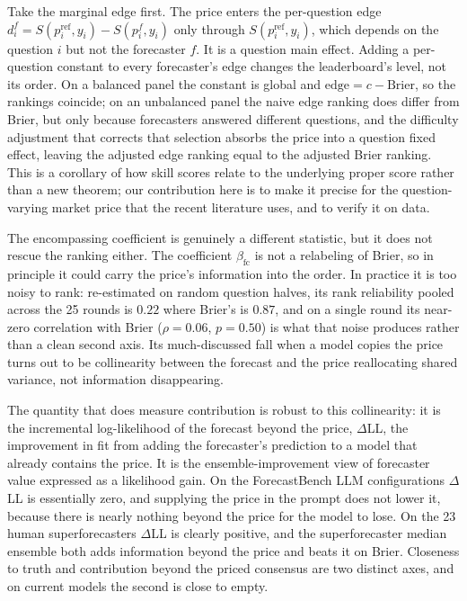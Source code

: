 \documentclass[11pt]{article}
\begin{document}
Take the marginal edge first. The price enters the per-question edge $d_i^f = S(p^{\mathrm{ref}}_i,y_i) - S(p^f_i,y_i)$ only through $S(p^{\mathrm{ref}}_i,y_i)$, which depends on the question $i$ but not the forecaster $f$. It is a question main effect. Adding a per-question constant to every forecaster's edge changes the leaderboard's level, not its order. On a balanced panel the constant is global and $\mathrm{edge} = c - \mathrm{Brier}$, so the rankings coincide; on an unbalanced panel the naive edge ranking does differ from Brier, but only because forecasters answered different questions, and the difficulty adjustment that corrects that selection absorbs the price into a question fixed effect, leaving the adjusted edge ranking equal to the adjusted Brier ranking. This is a corollary of how skill scores relate to the underlying proper score \citep{murphy1973,wheatcroft2019} rather than a new theorem; our contribution here is to make it precise for the question-varying market price that the recent literature uses, and to verify it on data.

The encompassing coefficient is genuinely a different statistic, but it does not rescue the ranking either. The coefficient $\beta_{\mathrm{fc}}$ is not a relabeling of Brier, so in principle it could carry the price's information into the order. In practice it is too noisy to rank: re-estimated on random question halves, its rank reliability pooled across the 25 rounds is $0.22$ where Brier's is $0.87$, and on a single round its near-zero correlation with Brier ($\rho=0.06$, $p=0.50$) is what that noise produces rather than a clean second axis. Its much-discussed fall when a model copies the price turns out to be collinearity between the forecast and the price reallocating shared variance, not information disappearing.

The quantity that does measure contribution is robust to this collinearity: it is the incremental log-likelihood of the forecast beyond the price, $\Delta$LL, the improvement in fit from adding the forecaster's prediction to a model that already contains the price. It is the ensemble-improvement view of forecaster value \citep{satopaa2014,alur2025} expressed as a likelihood gain. On the ForecastBench LLM configurations $\Delta$LL is essentially zero, and supplying the price in the prompt does not lower it, because there is nearly nothing beyond the price for the model to lose. On the 23 human superforecasters $\Delta$LL is clearly positive, and the superforecaster median ensemble both adds information beyond the price and beats it on Brier. Closeness to truth and contribution beyond the priced consensus are two distinct axes, and on current models the second is close to empty.
\end{document}
